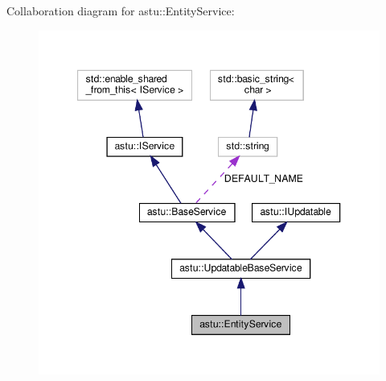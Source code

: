 Collaboration diagram for astu\+:\+:Entity\+Service\+:\nopagebreak
\begin{figure}[H]
\begin{center}
\leavevmode
\includegraphics[width=347pt]{classastu_1_1EntityService__coll__graph}
\end{center}
\end{figure}
